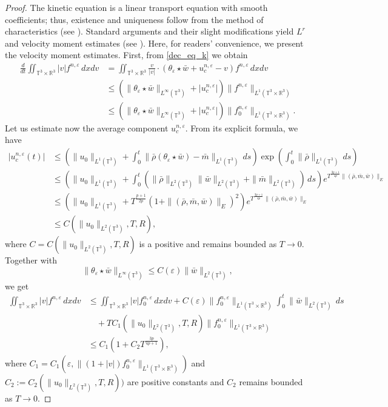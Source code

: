 \documentclass[10pt,reqno]{amsart}
\numberwithin{equation}{section}
\newcommand{\R}{\mathbb R}
\newcommand{\T}{\mathbb T}
\newcommand{\e}{\varepsilon}
\newcommand{\lt}{\left}
\newcommand{\rt}{\right}
\newcommand{\inttr}{\iint_{\T^3 \times \R^3}}
\begin{document}
\begin{proof}
The kinetic equation is a linear transport equation with smooth coefficients; thus, existence and uniqueness follow from the method of characteristics (see \cite{DL89}). Standard arguments and their slight modifications yield $L^r$ and velocity moment estimates (see \cite[Lemma 4.1]{CCK16}).  Here, for readers' convenience, we present the velocity moment estimates. First, from \eqref{dec_eq_k} we obtain
\[\begin{aligned}
\frac{d}{dt}\inttr |v| f^{n,\e}\,dxdv &= \inttr \frac{v}{|v|}\cdot (\theta_\e \star \bar w + u_c^{n,\e} - v) f^{n,\e}\,dxdv\\
&\le \lt(\|\theta_\e \star \bar w\|_{L^\infty(\T^3)} + |u_c^{n,\e}| \rt) \|f^{n,\e}\|_{L^1(\T^3\times\R^3)}\\
&\le \lt(\|\theta_\e \star \bar w\|_{L^\infty(\T^3)} + |u_c^{n,\e}| \rt) \|f_0^{n,\e}\|_{L^1(\T^3\times\R^3)}.
\end{aligned}\]
Let us estimate now the average component $u_c^{n,\e}$. From its explicit formula, we have
\[\begin{aligned}
|u^{n,\e}_c(t)| &\le \lt(\|u_0\|_{L^1(\T^3)} + \int_0^t \| \bar \rho(\theta_\e \star \bar w) - \bar m\|_{L^1(\T^3)}\,ds \rt)\exp\lt( \int_0^t \|\bar \rho\|_{L^1(\T^3)}\,ds\rt)\\
&\le \lt( \|u_0\|_{L^1(\T^3)} + \int_0^t \lt(\|\bar \rho\|_{L^2(\T^3)} \|\bar w\|_{L^2(\T^3)} + \|\bar m\|_{L^2(\T^3)}\rt)\,ds\rt)e^{T^{\frac{3p+1}{4p}} \|(\bar \rho, \bar m, \bar w)\|_{E}}\\
&\le  \lt( \|u_0\|_{L^1(\T^3)} + T^{\frac{p+1}{2p}}(1+\|(\bar \rho, \bar m, \bar w)\|_{E})^2 \rt)e^{T^{\frac{3p+1}{4p}} \|(\bar \rho, \bar m, \bar w)\|_{E}}\\
&\le C(\|u_0\|_{L^2(\T^3)}, T, R),
\end{aligned}\]
where $C=C(\|u_0\|_{L^2(\T^3)}, T, R)$ is a positive and remains bounded as $T \to 0$. Together with 
\[
\|\theta_\e \star\bar w\|_{L^\infty(\T^3)} \le C(\e) \|\bar w\|_{L^2(\T^3)},
\]
we get
\[\begin{aligned}
\inttr |v| f^{n,\e}\,dxdv &\le \inttr |v| f_0^{n,\e}\,dxdv + C(\e) \|f_0^{n,\e}\|_{L^1(\T^3\times\R^3)}\int_0^t \|\bar w\|_{L^2(\T^3)}\,ds\\
&\quad + T C_1(\|u_0\|_{L^2(\T^3)}, T, R)\|f_0^{n,\e}\|_{L^1(\T^3\times\R^3)}\\
&\le C_1 (1+ C_2 T^{\frac{3p}{4p+1}}),
\end{aligned}
\]
where $C_1= C_1(\e, \|(1+|v|)f_0^{n,\e}\|_{L^1(\T^3\times\R^3)})$ and $C_2:=C_2(\|u_0\|_{L^2(\T^3)}, T, R))$ are positive constants and $C_2$ remains bounded as $T \to 0$.


\end{proof}
\end{document}
